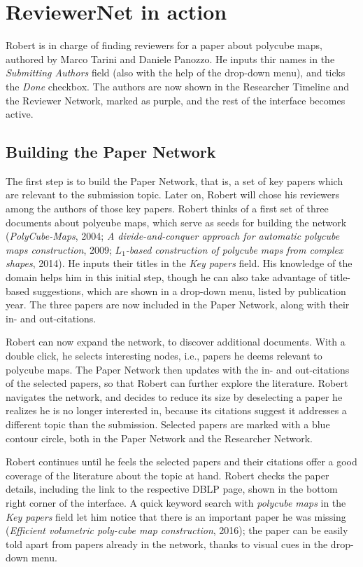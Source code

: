 %

\section{ReviewerNet in action}

Robert is in charge of finding reviewers for a paper about polycube maps, authored by Marco Tarini and Daniele Panozzo. He inputs thir names in the \emph{Submitting Authors} field (also with the help of the drop-down menu), and ticks the \emph{Done} checkbox. The authors are now shown in the Researcher Timeline and the Reviewer Network, marked as purple, and the rest of the interface becomes active. 

\subsection{Building the Paper Network} 
\label{sec:demoPN}
The first step is to build the Paper Network, that is, a set of key papers which are relevant to the submission topic. Later on, Robert will chose his reviewers among the authors of those key papers. Robert thinks of a first set of three documents about polycube maps, which serve as seeds for building the network (\emph{PolyCube-Maps}, 2004; \emph{A divide-and-conquer approach for automatic polycube maps construction}, 2009; \emph{$L_1$-based construction of polycube maps from complex shapes}, 2014). He inputs their titles in the \emph{Key papers} field. His knowledge of the domain helps him in this initial step, though he can also take advantage of title-based suggestions, which are shown in a drop-down menu, listed by publication year. The three papers are now included in the Paper Network, along with their in- and out-citations. 

Robert can now expand the network, to discover additional documents. With a double click, he selects interesting nodes, i.e., papers he deems relevant to polycube maps. The Paper Network then updates with the in- and out-citations of the selected papers, so that Robert can further explore the literature. Robert navigates the network, and decides to reduce its size by deselecting a paper he realizes he is no longer interested in, because its citations suggest it addresses a different topic than the submission. Selected papers are marked with a blue contour circle, both in the Paper Network and the Researcher Network. 

Robert continues until he feels the selected papers and their citations offer a good coverage of the literature about the topic at hand. Robert checks the paper details, including the link to the respective DBLP page, shown in the bottom right corner of the interface. A quick keyword search with \emph{polycube maps} in the \emph{Key papers} field let him notice that there is an important paper he was missing (\emph{Efficient volumetric poly-cube map construction}, 2016); the paper can be easily told apart from papers already in the network, thanks to visual cues in the drop-down menu. 

